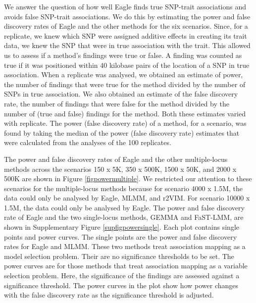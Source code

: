 \documentclass{article}
\begin{document}
We answer the question of how well Eagle finds true SNP-trait associations and avoids false SNP-trait associations. We do this by estimating the 
power and false discovery rates of Eagle and the other methods for the six scenarios.  Since, for a replicate, we knew which SNP were assigned additive effects in 
creating its trait data, we knew the SNP that were in true association with the trait. This allowed us to assess if a method's findings were true or 
false. A  finding was counted as true if it was positioned within 40 kilobase pairs of the location of a SNP in true association. 
When a replicate was analysed, we obtained an estimate of power, the number of findings that were true for the method divided by the 
number of SNPs in true association. We also obtained an estimate of the false discovery rate, the number of findings that were false for the method 
divided by the number of (true and false) findings for the method.  Both these estimates varied with replicate. 
The power (false discovery rate) of a method, for a scenario, was found by taking the median of the power (false discovery rate) estimates that were calculated from the analyses of 
the 100 replicates. 



The power and false discovery rates of Eagle and the other multiple-locus methods across the scenarios 150 x 5K, 350 x 500K, 1500 x 50K, and 2000 x 500K are shown in Figure \ref{figpowermultiple}.  We restricted our attention to these scenarios for the multiple-locus methods because for scenario 4000 x 1.5M, 
the data could only be analysed by Eagle, MLMM, and r2VIM. For scenario 10000 x 1.5M, the data could only be analysed by Eagle. 
The power and false discovery rate of Eagle and the two single-locus methods, GEMMA and FaST-LMM,  are shown in
Supplementary Figure \ref{supfigpowersingle}.  Each plot contains 
single points and power curves. The single points are the power and false discovery rates for Eagle and MLMM.
These two methods treat association mapping as a model selection problem. Their are no significance thresholds to be set. 
The power curves are for those methods that treat association mapping as a variable selection problem. Here, the 
significance of the findings are assessed against a significance threshold. The power curves in the plot show how power changes with 
the false discovery rate as the significance threshold  is adjusted. 
\end{document}
